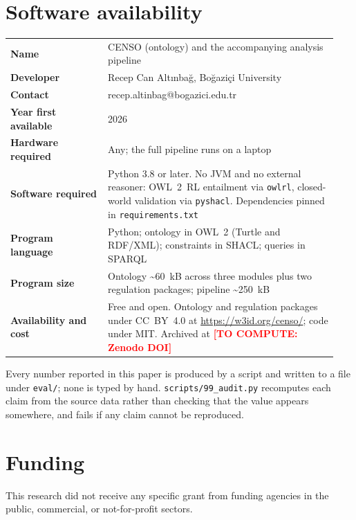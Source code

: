 \documentclass[preprint,review,12pt,authoryear]{elsarticle}
\newcommand{\pending}[1]{\textcolor{red}{\textbf{[TO COMPUTE: #1]}}}
\begin{document}
\section*{Software availability}
\noindent
\begin{tabular}{@{}p{0.28\linewidth}p{0.66\linewidth}@{}}
\textbf{Name} & CENSO (ontology) and the accompanying analysis pipeline \\
\textbf{Developer} & Recep Can Altınbağ, Boğaziçi University \\
\textbf{Contact} & recep.altinbag@bogazici.edu.tr \\
\textbf{Year first available} & 2026 \\
\textbf{Hardware required} & Any; the full pipeline runs on a laptop \\
\textbf{Software required} & Python 3.8 or later. No JVM and no external
  reasoner: OWL~2~RL entailment via \texttt{owlrl}, closed-world validation via
  \texttt{pyshacl}. Dependencies pinned in \texttt{requirements.txt} \\
\textbf{Program language} & Python; ontology in OWL~2 (Turtle and RDF/XML);
  constraints in SHACL; queries in SPARQL \\
\textbf{Program size} & Ontology \textasciitilde{}60~kB across three modules
  plus two regulation packages; pipeline \textasciitilde{}250~kB \\
\textbf{Availability and cost} & Free and open. Ontology and regulation
  packages under CC~BY~4.0 at \url{https://w3id.org/censo/}; code under MIT.
  Archived at \pending{Zenodo DOI} \\
\end{tabular}

\vspace{1em}
\noindent
Every number reported in this paper is produced by a script and written to a
file under \texttt{eval/}; none is typed by hand. \texttt{scripts/99\_audit.py}
recomputes each claim from the source data rather than checking that the value
appears somewhere, and fails if any claim cannot be reproduced.









\section*{Funding}
This research did not receive any specific grant from funding agencies in the
public, commercial, or not-for-profit sectors.
\end{document}
